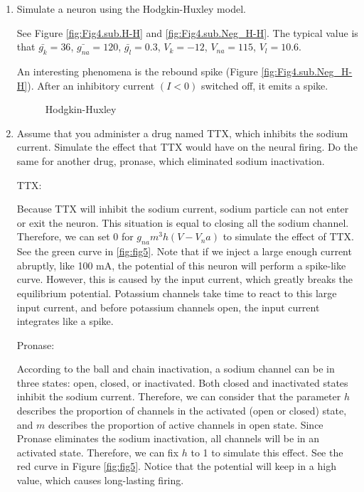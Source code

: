 \documentclass[11pt]{article}
\begin{document}
\begin{enumerate}
		\item Simulate a neuron using the Hodgkin-Huxley model.
		
		See Figure \ref{fig:Fig4.sub.H-H} and \ref{fig:Fig4.sub.Neg_H-H}. The typical value is that $\bar{g_k} = 36$, $\bar{g_{na}} = 120$, $\bar{g_l} = 0.3$, $V_k = -12$, $V_{na} = 115$, $V_l = 10.6$.
		
		An interesting phenomena is the rebound spike (Figure \ref{fig:Fig4.sub.Neg_H-H}). After an inhibitory current $(I < 0)$ switched off, it emits a spike. 
		
		\begin{figure}[ht]
			\centering
			\caption{Hodgkin-Huxley}
		\end{figure}
		
		\item Assume that you administer a drug named TTX, which inhibits the sodium current. Simulate the effect that TTX would have on the neural firing. Do the same for another drug, pronase, which eliminated sodium inactivation.
		
		TTX:
		
		Because TTX will inhibit the sodium current, sodium particle can not enter or exit the neuron. This situation is equal to closing all the sodium channel. Therefore, we can set 0 for $g_{na}m^3h(V-V_na)$ to simulate the effect of TTX. See the green curve in \ref{fig:fig5}. Note that if we inject a large enough current abruptly, like 100 mA, the potential of this neuron will perform a spike-like curve. However, this is caused by the input current, which greatly breaks the equilibrium potential. Potassium channels take time to react to this large input current, and before potassium channels open, the input current integrates like a spike.
		
		Pronase:
		
		According to the ball and chain inactivation, a sodium channel can be in three states: open, closed, or inactivated. Both closed and inactivated states inhibit the sodium current. Therefore, we can consider that the parameter $h$ describes the proportion of channels in the activated (open or closed) state, and $m$ describes the proportion of active channels in open state. Since Pronase eliminates the sodium inactivation, all channels will be in an activated state. Therefore, we can fix $h$ to 1 to simulate this effect. See the red curve in Figure \ref{fig:fig5}. Notice that the potential will keep in a high value, which causes long-lasting firing.
		

\end{enumerate}
\end{document}
